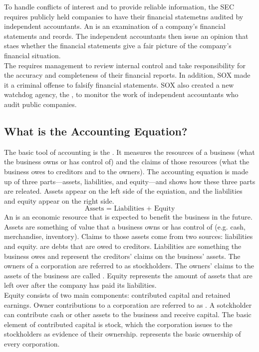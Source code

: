 \documentclass{article}
\begin{document}
To handle conflicts of interest and to provide reliable information, the SEC requires publicly held companies to have their financial statemetns audited by independent accountants. An  is an examination of a company's financial statements and reords. The independent accountants then issue an opinion that staes whether the financial statements give a fair picture of the company's financial situation. \\ 

The  requires management to review internal control and take responsibility for the accuracy and completeness of their financial reports. In addition, SOX made it a criminal offense to falsify financial statements. SOX also created a new watchdog agency, the , to monitor the work of independent accountants who audit public companies. 

\subsection{What is the Accounting Equation?}

The basic tool of accounting is the . It measures the resources of a business (what the business owns or has control of) and the claims of those resources (what the business owes to creditors and to the owners). The accounting equation is made up of three parts---assets, liabilities, and equity---and shows how these three parts are releated. Assets appear on the left side of the equiation, and the liabilities and equity appear on the right side. $$\textrm{Assets = Liabilities + Equity}$$ An  is an economic resource that is expected to benefit the business in the future. Assets are something of value that a business owns or has control of (e.g. cash, merchandise, inventory). Claims to those assets come from two sources: liabilities and equity.  are debts that are owed to creditors. Liabilities are something the business owes and represent the creditors' claims on the business' assets. The owners of a corporation are referred to as stockholders. The owners' claims to the assets of the business are called . Equity represents the amount of assets that are left over after the company has paid its liabilities. \\ 

Equity consists of two main components: contributed capital and retained earnings. Owner contributions to a corporation are referred to as . A sotckholder can contribute cash or other assets to the business and receive capital. The basic element of contributed capital is stock, which the corporation issues to the stockholders as evidence of their ownership.  represents the basic ownership of every corporation. \\ 
\end{document}

